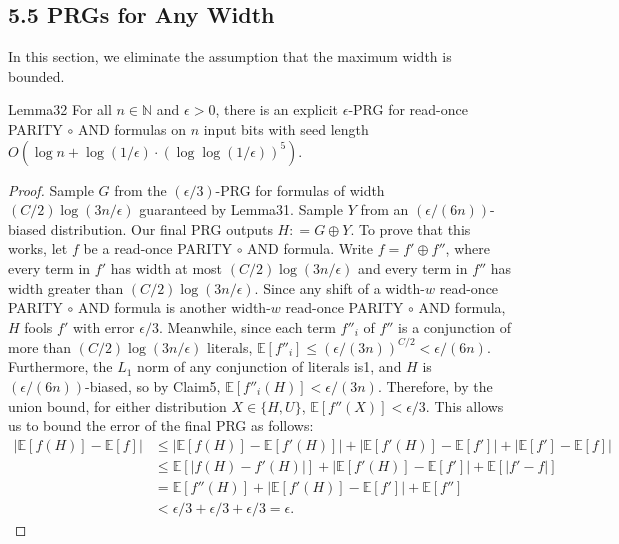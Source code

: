 \subsection*{5.5 PRGs for Any Width}
In this section, we eliminate the assumption that the maximum width is bounded.
\begin{authorclaim}{Lemma32}
For all $n\in\mathbb N$ and $\epsilon>0$, there is an explicit $\epsilon$-PRG for read-once PARITY $\circ$ AND formulas on $n$ input bits with seed length $O(\log n+\log(1/\epsilon)\cdot(\log\log(1/\epsilon))^5)$.
\end{authorclaim}
\begin{proof}
Sample $G$ from the $(\epsilon/3)$-PRG for formulas of width $(C/2)\log(3n/\epsilon)$ guaranteed by Lemma31. Sample $Y$ from an $(\epsilon/(6n))$-biased distribution. Our final PRG outputs $H\mathrel{\mathop:}=G\oplus Y$.
To prove that this works, let $f$ be a read-once PARITY $\circ$ AND formula. Write $f=f'\oplus f''$, where every term in $f'$ has width at most $(C/2)\log(3n/\epsilon)$ and every term in $f''$ has width greater than $(C/2)\log(3n/\epsilon)$.
Since any shift of a width-$w$ read-once PARITY $\circ$ AND formula is another width-$w$ read-once PARITY $\circ$ AND formula, $H$ fools $f'$ with error $\epsilon/3$. Meanwhile, since each term $f''_i$ of $f''$ is a conjunction of more than $(C/2)\log(3n/\epsilon)$ literals, $\mathbb E[f''_i]\le(\epsilon/(3n))^{C/2}<\epsilon/(6n)$.
Furthermore, the $L_1$ norm of any conjunction of literals is1, and $H$ is $(\epsilon/(6n))$-biased, so by Claim5, $\mathbb E[f''_i(H)]<\epsilon/(3n)$. Therefore, by the union bound, for either distribution $X\in\{H,U\}$, $\mathbb E[f''(X)]<\epsilon/3$.
This allows us to bound the error of the final PRG as follows:
\begin{align*}
|\mathbb E[f(H)]-\mathbb E[f]|
&\le|\mathbb E[f(H)]-\mathbb E[f'(H)]|+|\mathbb E[f'(H)]-\mathbb E[f']|+|\mathbb E[f']-\mathbb E[f]|\\
&\le\mathbb E[|f(H)-f'(H)|]+|\mathbb E[f'(H)]-\mathbb E[f']|+\mathbb E[|f'-f|]\\
&=\mathbb E[f''(H)]+|\mathbb E[f'(H)]-\mathbb E[f']|+\mathbb E[f'']\\
&<\epsilon/3+\epsilon/3+\epsilon/3=\epsilon.
\end{align*}
\end{proof}
